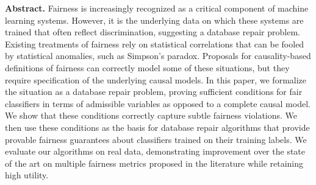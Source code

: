 \textbf{Abstract.} Fairness is increasingly recognized as a critical component of machine learning systems. However, it is the underlying data on which these systems are trained that often reflect discrimination, suggesting a database repair problem. Existing treatments of fairness rely on statistical correlations that can be fooled by statistical anomalies, such as Simpson's paradox. Proposals for causality-based definitions of fairness can correctly model some of these situations, but they require specification of the underlying causal models. In this paper, we formalize the situation as a database repair problem, proving sufficient conditions for fair classifiers in terms of admissible variables as opposed to a complete causal model. We show that these conditions correctly capture subtle fairness violations. We then use these conditions as the basis for database repair algorithms that provide provable fairness guarantees about classifiers trained on their training labels. We evaluate our algorithms on real data, demonstrating improvement over the state of the art on multiple fairness metrics proposed in the literature while retaining high utility.





~\\




